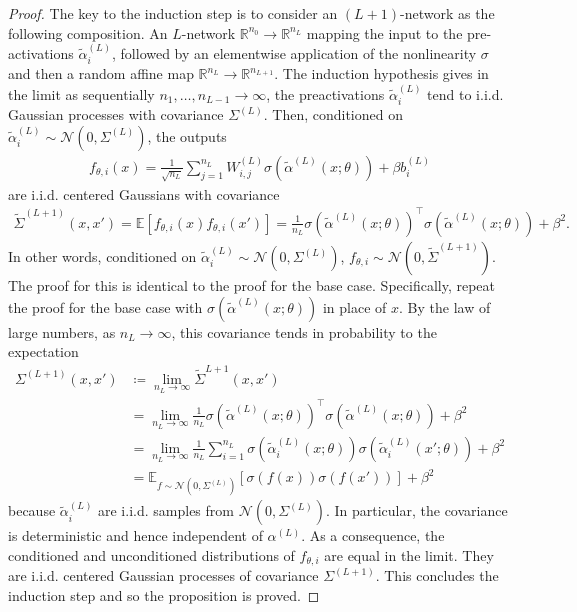 \documentclass[10pt]{article}
\newcommand{\RR}{\mathbb{R}}
\newcommand{\EE}{\mathbb{E}}
\newcommand{\NN}{\mathcal{N}}
\newcommand{\paran}[1]{{( #1 )}}
\begin{document}
\begin{proof}
The key to the induction step is to consider an $(L + 1)$-network as the following composition. An $L$-network $\RR^{n_0} \rightarrow \RR^{n_L}$ mapping the input to the pre-activations $\tilde{\alpha}^\paran{L}_i$, followed by an elementwise application of the nonlinearity $\sigma$ and then a random affine map $\RR^{n_L} \rightarrow \RR^{n_{L + 1}}$. The induction hypothesis gives in the limit as sequentially $n_1, \ldots, n_{L - 1} \rightarrow \infty$, the preactivations $\tilde{\alpha}^\paran{L}_i$ tend to i.i.d. Gaussian processes with covariance $\Sigma^\paran{L}$. Then, conditioned on $\tilde{\alpha}^\paran{L}_i \sim \NN(0,\Sigma^\paran{L})$, the outputs
\begin{align*}
f_{\theta,i}(x) = \frac{1}{\sqrt{n_L}} \sum_{j = 1}^{n_L} W^\paran{L}_{i,j} \sigma(\tilde{\alpha}^\paran{L}(x;\theta)) + \beta b^\paran{L}_i
\end{align*}
are i.i.d. centered Gaussians with covariance
\begin{align*}
\tilde{\Sigma}^\paran{L + 1}(x,x') = \EE[f_{\theta,i}(x) f_{\theta,i}(x')] = \frac{1}{n_L} \sigma(\tilde{\alpha}^\paran{L}(x;\theta))^\top \sigma(\tilde{\alpha}^\paran{L}(x;\theta)) + \beta^2.
\end{align*}
In other words, conditioned on $\tilde{\alpha}^\paran{L}_i \sim \NN(0,\Sigma^\paran{L})$, $f_{\theta,i} \sim \NN(0,\tilde{\Sigma}^\paran{L + 1})$. The proof for this is identical to the proof for the base case. Specifically, repeat the proof for the base case with $\sigma(\tilde{\alpha}^\paran{L}(x;\theta))$ in place of $x$. By the law of large numbers, as $n_L \rightarrow \infty$, this covariance tends in probability to the expectation
\begin{align*}
\Sigma^\paran{L + 1}(x,x') &\coloneqq \lim_{n_L \rightarrow \infty} \tilde{\Sigma}^{L + 1}(x,x') \\
&= \lim_{n_L \rightarrow \infty} \frac{1}{n_L} \sigma(\tilde{\alpha}^\paran{L}(x;\theta))^\top \sigma(\tilde{\alpha}^\paran{L}(x;\theta)) + \beta^2 \\
&= \lim_{n_L \rightarrow \infty} \frac{1}{n_L} \sum_{i = 1}^{n_L} \sigma(\tilde{\alpha}^\paran{L}_i(x;\theta)) \sigma(\tilde{\alpha}^\paran{L}_i(x';\theta)) + \beta^2 \\
&= \EE_{f \sim \NN(0,\Sigma^\paran{L})}[\sigma(f(x))\sigma(f(x'))] + \beta^2
\end{align*}
because $\tilde{\alpha}^\paran{L}_i$ are i.i.d. samples from $\NN(0,\Sigma^\paran{L})$. In particular, the covariance is deterministic and hence independent of $\alpha^\paran{L}$. As a consequence, the conditioned and unconditioned distributions of $f_{\theta,i}$ are equal in the limit. They are i.i.d. centered Gaussian processes of covariance $\Sigma^\paran{L + 1}$. This concludes the induction step and so the proposition is proved.
\end{proof}
\end{document}
